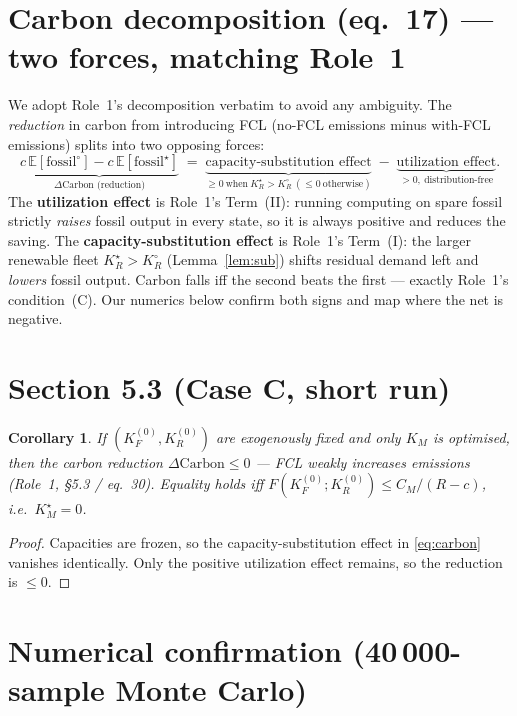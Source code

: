 \documentclass[11pt]{article}
\newtheorem{corollary}{Corollary}
\theoremstyle{definition}
\begin{document}
\section{Carbon decomposition (eq.~17) --- two forces, matching Role~1}
We adopt Role~1's decomposition verbatim to avoid any ambiguity. The
\emph{reduction} in carbon from introducing FCL (no-FCL emissions minus with-FCL
emissions) splits into two opposing forces:
\begin{equation}
\underbrace{c\,\mathbb E[\text{fossil}^{\circ}]-c\,\mathbb E[\text{fossil}^{\star}]}_{\Delta\text{Carbon (reduction)}}
\;=\;
\underbrace{\text{capacity-substitution effect}}_{\ge 0\ \text{when}\ K_R^{\star}>K_R^{\circ}\ (\le 0\ \text{otherwise})}
\;-\;
\underbrace{\text{utilization effect}}_{>0,\ \text{distribution-free}} . \label{eq:carbon}
\end{equation}
The \textbf{utilization effect} is Role~1's Term~(II): running computing on spare
fossil strictly \emph{raises} fossil output in every state, so it is always
positive and reduces the saving. The \textbf{capacity-substitution effect} is
Role~1's Term~(I): the larger renewable fleet $K_R^{\star}>K_R^{\circ}$
(Lemma~\ref{lem:sub}) shifts residual demand left and \emph{lowers} fossil output.
Carbon falls iff the second beats the first --- exactly Role~1's condition~(C).
Our numerics below confirm both signs and map where the net is negative.

\section{Section 5.3 (Case C, short run)}
\begin{corollary}\label{cor:caseC}
If $(K_F^{(0)},K_R^{(0)})$ are exogenously fixed and only $K_M$ is optimised, then
the carbon reduction $\Delta\text{Carbon}\le 0$ --- FCL weakly \emph{increases}
emissions (Role~1, \S5.3 / eq.~30). Equality holds iff
$F(K_F^{(0)};K_R^{(0)})\le C_M/(R-c)$, i.e.\ $K_M^{\star}=0$.
\end{corollary}

\begin{proof}
Capacities are frozen, so the capacity-substitution effect in \eqref{eq:carbon}
vanishes identically. Only the positive utilization effect remains, so the
reduction is $\le 0$.
\end{proof}

\section{Numerical confirmation (40\,000-sample Monte Carlo)}
\end{document}

